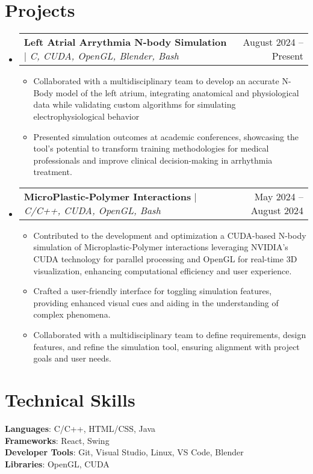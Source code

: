 \documentclass[letterpaper,11pt]{article}
\makeatletter
\newcommand{\resumeItem}[1]{
  \item\small{
    {#1 \vspace{-2pt}}
  }
}
\newcommand{\resumeProjectHeading}[2]{
    \item
    \begin{tabular*}{0.97\textwidth}{l@{\extracolsep{\fill}}r}
      \small#1 & #2 \\
    \end{tabular*}\vspace{-7pt}
}
\newcommand{\resumeSubHeadingListStart}{\begin{itemize}[leftmargin=0.15in, label={}]}
\newcommand{\resumeSubHeadingListEnd}{\end{itemize}}
\newcommand{\resumeItemListStart}{\begin{itemize}}
\newcommand{\resumeItemListEnd}{\end{itemize}\vspace{-5pt}}
\makeatother
\begin{document}
\section{Projects}
    \resumeSubHeadingListStart
      \resumeProjectHeading
          {\textbf{Left Atrial Arrythmia N-body Simulation} $|$ \emph{C, CUDA, OpenGL, Blender, Bash}}{August 2024 -- Present}
          \resumeItemListStart
            \resumeItem{Collaborated with a multidisciplinary team to develop an accurate N-Body model of the left atrium, integrating anatomical and physiological data while validating custom algorithms for simulating electrophysiological behavior}
            \resumeItem{Presented simulation outcomes at academic conferences, showcasing the tool’s potential to transform training methodologies for medical professionals and improve clinical decision-making in arrhythmia treatment.}
          \resumeItemListEnd
      \resumeProjectHeading
          {\textbf{MicroPlastic-Polymer Interactions} $|$ \emph{C/C++, CUDA, OpenGL, Bash}}{May 2024 -- August 2024}
          \resumeItemListStart
            \resumeItem{Contributed to the development and optimization a CUDA-based N-body simulation of Microplastic-Polymer interactions leveraging NVIDIA's CUDA technology for parallel processing and OpenGL for real-time 3D visualization, enhancing computational efficiency and user experience.}
            \resumeItem{Crafted a user-friendly interface for toggling simulation features, providing enhanced visual cues and aiding in the understanding of complex phenomena.}
            \resumeItem{Collaborated with a multidisciplinary team to define requirements, design features, and refine the simulation tool, ensuring alignment with project goals and user needs.}
          \resumeItemListEnd
    \resumeSubHeadingListEnd



%
\section{Technical Skills}
 \begin{itemize}[leftmargin=0.15in, label={}]
    \small{\item{
     \textbf{Languages}{: C/C++, HTML/CSS, Java} \\
     \textbf{Frameworks}{: React, Swing} \\
     \textbf{Developer Tools}{: Git, Visual Studio, Linux, VS Code, Blender} \\
     \textbf{Libraries}{: OpenGL, CUDA}
    }}
 \end{itemize}


\end{document}
